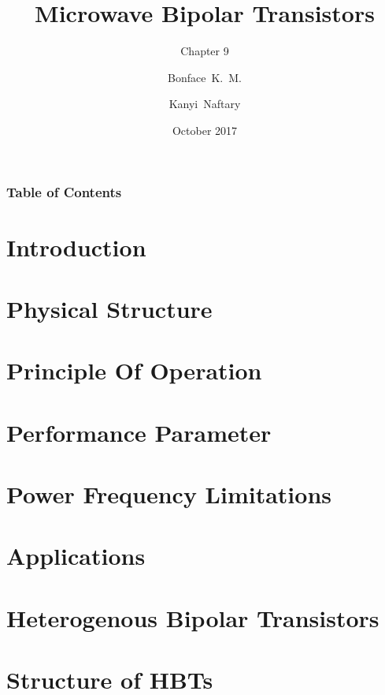 \documentclass{beamer}
\title{Microwave Bipolar Transistors}
\subtitle{Chapter 9}
\author{Bonface~K.~M. \and Kanyi~Naftary}
\institute{
  Department of Electrical and Electronic Engineering \\
  University of Nairobi
}
\date{October 2017}
\begin{document}
\frame{\titlepage}
\begin{frame}
  \frametitle{Table of Contents}
  \tableofcontents
\end{frame}

\section{Introduction}



\section{Physical Structure}


\section{Principle Of Operation}


\section{Performance Parameter}


\section{Power Frequency Limitations}


\section{Applications}


\section{Heterogenous Bipolar Transistors}


\section{Structure of HBTs}


%
\end{document}
